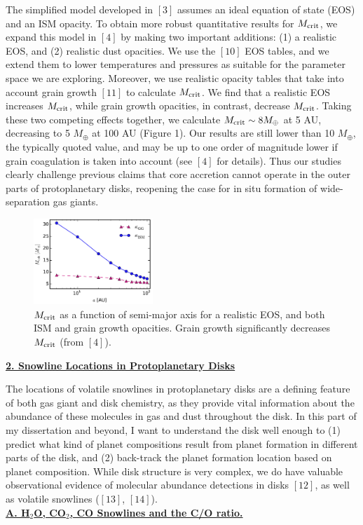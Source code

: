 \documentclass[12pt, letterpaper]{article}
\begin{document}
The simplified model developed in $[3]$ assumes an ideal equation of state (EOS) and an ISM opacity. To obtain more robust quantitative results for $M_{\rm crit}$, we expand this model in $[4]$ by making two important additions: (1) a realistic EOS, and (2) realistic dust opacities. We use the $[10]$ EOS tables, and we extend them to lower temperatures and pressures as suitable for the parameter space we are exploring. Moreover, we use realistic opacity tables that take into account grain growth $[11]$ to calculate $M_{\rm crit}$. We find that a realistic EOS increases $M_{\rm crit}$, while grain growth opacities, in contrast, decrease $M_{\rm crit}$. Taking these two competing effects together, we calculate $M_{\rm crit} \sim 8 M_{\oplus}$ at 5 AU, decreasing to 5 $M_{\oplus}$ at 100 AU (Figure 1). Our results are still lower than 10 $M_{\oplus}$, the typically quoted value, and may be up to one order of magnitude lower if grain coagulation is taken into account (see $[4]$ for details). Thus our studies clearly challenge previous claims that core accretion cannot operate in the outer parts of protoplanetary disks, reopening the case for in situ formation of wide-separation gas giants. 
\begin{figure}
  \begin{center}
    \includegraphics[width=0.4\textwidth]{Mcrit_vs_a_gg}
  \end{center}
  \caption{$M_{\rm crit}$ as a function of semi-major axis for a realistic EOS, and both ISM and grain growth opacities. Grain growth significantly decreases $M_{\rm crit}$ (from $[4]$).}
\end{figure}
\underline{\textbf{2. Snowline Locations in Protoplanetary Disks}}

The locations of volatile snowlines in protoplanetary disks are a defining feature of both gas giant and disk chemistry, as they provide vital information about the abundance of these molecules in gas and dust throughout the disk. In this part of my dissertation and beyond, I want to understand the disk well enough to (1) predict what kind of planet compositions result from planet formation in different parts of the disk, and (2) back-track the planet formation location based on planet composition. While disk structure is very complex, we do have valuable observational evidence of molecular abundance detections in disks $[12]$, as well as volatile snowlines ($[13]$, $[14]$). \\
\underline{\textbf{A. H$_2$O, CO$_2$, CO Snowlines and the C/O ratio.}} 
\end{document}
